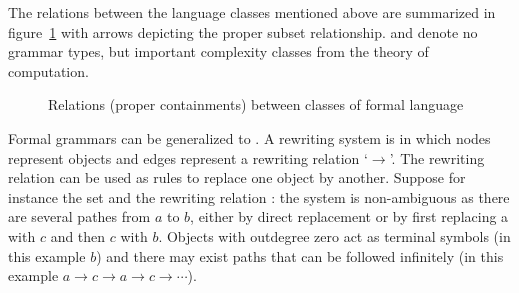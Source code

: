 
The relations between the language classes mentioned above are summarized
in figure~\ref{fig:complexityzoo} with arrows depicting the proper subset
relationship.  and  denote no grammar types, but important 
complexity classes from the theory of computation.

\begin{figure}[h]
\caption{Relations (proper containments) between classes of formal language}
\label{fig:complexityzoo}
\end{figure}


\label{p:rewritingsystem} Formal grammars can be generalized to .  A rewriting system is  in which nodes represent
objects and edges represent a rewriting relation `$\rightarrow$'. The rewriting
relation can be used as rules to replace one object by another. Suppose for
instance the set  and the rewriting relation : the system is
non-ambiguous as there are several pathes from $a$ to $b$, either by direct
replacement or by first replacing a with $c$ and then $c$ with $b$. Objects
with outdegree zero act as terminal symbols (in this example $b$) and there may
exist paths that can be followed infinitely (in this example $a\rightarrow
c\rightarrow a \rightarrow c \rightarrow \cdots$).


